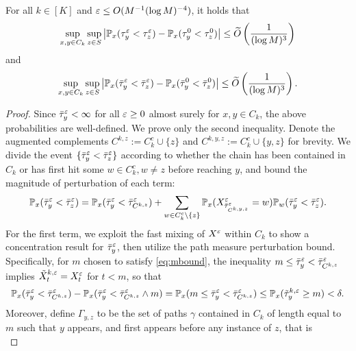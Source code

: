\begin{prop}\label{thm:supsup}
For all $k\in[K]$ and $\varepsilon\le O(M^{-1}(\log M)^{-4})$, it holds that
\begin{equation*}
\sup_{x,y\in C_k} \sup_{z\in S} \left\lvert\mathbb{P}_x(\tau_y^\varepsilon < \tau_z^\varepsilon) - \mathbb{P}_x(\tau_y^0 < \tau_z^0)\right\rvert \le \widetilde{O}\left(\frac{1}{(\log M)^3}\right)
\end{equation*}
and
\begin{equation*}
\sup_{x,y\in C_k} \sup_{z\in S} \left\lvert\mathbb{P}_x(\bar{\tau}_y^\varepsilon < \bar{\tau}_z^\varepsilon) - \mathbb{P}_x(\bar{\tau}_y^0 < \bar{\tau}_z^0)\right\rvert \le\widetilde{O}\left(\frac{1}{(\log M)^3}\right).
\end{equation*}
\end{prop}

\begin{proof}
Since $\bar{\tau}_y^\varepsilon<\infty$ for all $\varepsilon\ge 0$ almost surely for $x,y\in C_k$, the above probabilities are well-defined. We prove only the second inequality. Denote the augmented complements $C^{k,z}:=C_k^c\cup\{z\}$ and $C^{k,y,z}:=C_k^c\cup\{y,z\}$ for brevity. We divide the event $\{\bar{\tau}_y^\varepsilon < \bar{\tau}_z^\varepsilon\}$ according to whether the chain has been contained in $C_k$ or has first hit some $w\in C_k^c, w\neq z$ before reaching $y$, and bound the magnitude of perturbation of each term:
\begin{equation}\label{eq:banana}
\mathbb{P}_x(\bar{\tau}_y^\varepsilon < \bar{\tau}_z^\varepsilon) = \mathbb{P}_x(\bar{\tau}_y^\varepsilon < \bar{\tau}_{C^{k,z}}^\varepsilon) + \sum_{w\in C_k^c\setminus\{z\}} \mathbb{P}_x(X_{\bar{\tau}_{C^{k,y,z}}^\varepsilon}^\varepsilon = w) \mathbb{P}_w(\bar{\tau}_y^\varepsilon < \bar{\tau}_z^\varepsilon).
\end{equation}
For the first term, we exploit the fast mixing of $X^\varepsilon$ within $C_k$ to show a concentration result for $\bar{\tau}_y^\varepsilon$, then utilize the path measure perturbation bound. Specifically, for $m$ chosen to satisfy \eqref{eq:mbound}, the inequality $m\le \bar{\tau}_y^\varepsilon < \bar{\tau}_{C^{k,z}}^\varepsilon$ implies $\tilde{X}_t^{k,\varepsilon} = X_t^\varepsilon$ for $t<m$, so that
\begin{align}\label{eq:pear}
\mathbb{P}_x(\bar{\tau}_y^\varepsilon < \bar{\tau}_{C^{k,z}}^\varepsilon) - \mathbb{P}_x(\bar{\tau}_y^\varepsilon < \bar{\tau}_{C^{k,z}}^\varepsilon\wedge m) = \mathbb{P}_x(m\le \bar{\tau}_y^\varepsilon < \bar{\tau}_{C^{k,z}}^\varepsilon) \le \mathbb{P}_x(\tilde{\tau}_y^{k,\varepsilon} \ge m) <\delta.
\end{align}
Moreover, define $\Gamma_{y,z}$ to be the set of paths $\gamma$ contained in $C_k$ of length equal to $m$ such that $y$ appears, and first appears before any instance of $z$, that is
\begin{equation*}

\end{equation*}
\end{proof}
